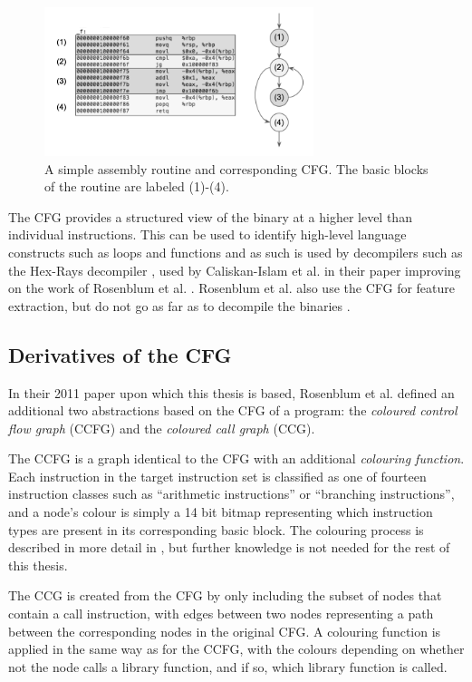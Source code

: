 \documentclass[a4paper,11pt]{kth-mag}
\begin{document}
\begin{figure}[!htb]
    \centering
    \includegraphics[width=0.7\textwidth]{cfg}
    \caption{A simple assembly routine and corresponding CFG. The basic blocks
    of the routine are labeled (1)-(4).}
    \label{fig:basic-blocks}
\end{figure}

The CFG provides a structured view of the binary at a higher level than
individual instructions. This can be used to identify high-level language
constructs such as loops and functions \parencite{cifuentes1993methodology} and
as such is used by decompilers such as the Hex-Rays decompiler \parencite{hex2013hex},
used by Caliskan-Islam et al. in their paper improving on the work of
Rosenblum et al. \parencite{caliskan2015coding}. Rosenblum et al. also use the
CFG for feature extraction, but do not go as far as to decompile the binaries
\parencite{rosenblum2011wrote}.

\subsection{Derivatives of the CFG}
\label{sec:cfg-derivatives}
In their 2011 paper upon which this thesis is based, Rosenblum et al. defined
an additional two abstractions based on the CFG of a program: the
\emph{coloured control flow graph} (CCFG) and the \emph{coloured call graph}
(CCG).

The CCFG is a graph identical to the CFG with an additional \emph{colouring
function}. Each instruction in the target instruction set is classified as one
of fourteen instruction classes such as ``arithmetic instructions'' or
``branching instructions'', and a node's colour is simply a 14 bit bitmap
representing which instruction types are present in its corresponding basic
block. The colouring process is described in more detail in
\parencite{rosenblum2011recovering}, but further knowledge is not needed for
the rest of this thesis.

The CCG is created from the CFG by only including the subset of nodes that contain
a call instruction, with edges between two nodes representing a path between
the corresponding nodes in the original CFG. A colouring function is applied in
the same way as for the CCFG, with the colours depending on whether not the
node calls a library function, and if so, which library function is called.
\end{document}
